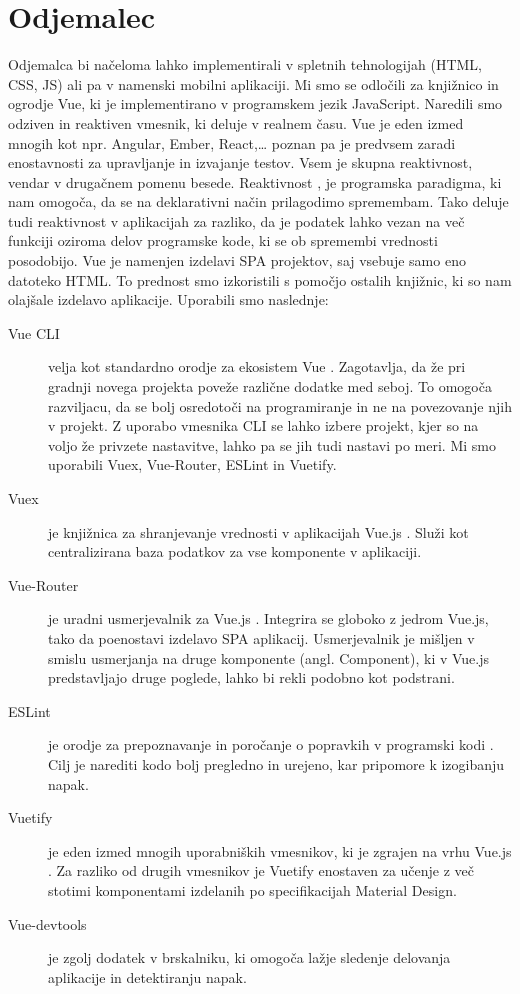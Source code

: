 \documentclass[a4paper, 12pt]{book}
\begin{document}
\section{Odjemalec}

Odjemalca bi načeloma lahko implementirali v spletnih tehnologijah (HTML, CSS, JS) ali pa v namenski mobilni aplikaciji. Mi smo se odločili za knjižnico in ogrodje Vue, ki je implementirano v programskem jezik JavaScript.  Naredili smo odziven in reaktiven vmesnik, ki deluje v realnem času. Vue je eden izmed mnogih kot npr. Angular, Ember, React,… poznan pa je predvsem zaradi enostavnosti za upravljanje in izvajanje testov. Vsem je skupna reaktivnost, vendar v drugačnem pomenu besede. Reaktivnost \cite{reaktivnost}, je programska paradigma, ki nam omogoča, da se na deklarativni način prilagodimo spremembam. Tako deluje tudi reaktivnost v aplikacijah za razliko, da je podatek lahko vezan na več funkciji oziroma delov programske kode, ki se ob spremembi vrednosti posodobijo. Vue je namenjen izdelavi SPA projektov, saj vsebuje samo eno datoteko HTML. To prednost smo izkoristili s pomočjo ostalih knjižnic, ki so nam olajšale izdelavo aplikacije. Uporabili smo naslednje:
\begin{description}
\item[Vue CLI] velja kot standardno orodje za ekosistem Vue \cite{VueCLI}. Zagotavlja, da že pri gradnji novega projekta poveže različne dodatke med seboj. To omogoča razviljacu, da se bolj osredotoči na programiranje in ne na povezovanje njih v projekt. Z uporabo vmesnika CLI se lahko izbere projekt, kjer so na voljo že privzete nastavitve, lahko pa se jih tudi nastavi po meri. Mi smo uporabili Vuex, Vue-Router, ESLint in Vuetify.
\item[Vuex] je knjižnica za shranjevanje vrednosti v aplikacijah Vue.js \cite{Vuex}. Služi kot centralizirana baza podatkov za vse komponente v aplikaciji. 
\item[Vue-Router] je uradni usmerjevalnik za Vue.js \cite{VueRouter}. Integrira se globoko z jedrom Vue.js, tako da poenostavi izdelavo SPA aplikacij. Usmerjevalnik je mišljen v smislu usmerjanja na druge komponente (angl. Component), ki v Vue.js predstavljajo druge poglede, lahko bi rekli podobno kot podstrani.
\item[ESLint] je orodje za prepoznavanje in poročanje o popravkih v programski kodi \cite{ESLint}. Cilj je narediti kodo bolj pregledno in urejeno, kar pripomore k izogibanju napak.
\item[Vuetify] je eden izmed mnogih uporabniških vmesnikov, ki je zgrajen na vrhu Vue.js \cite{Vuetify}. Za razliko od drugih vmesnikov je Vuetify enostaven za učenje z več stotimi komponentami izdelanih po specifikacijah Material Design.
\item[Vue-devtools] je zgolj dodatek v brskalniku, ki omogoča lažje sledenje delovanja aplikacije in detektiranju napak. 

\end{description}
\end{document}
